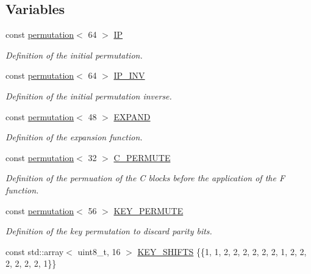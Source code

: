 \subsection*{Variables}
\begin{DoxyCompactItemize}
\item 
const \hyperlink{namespacedes64_1_1__internal_a5b829bc1e22d70ed35b925f8971a88d3}{permutation}$<$ 64 $>$ \hyperlink{namespacedes64_1_1__internal_af57a8d35e765dd0043cc1b7c3d558d38}{IP}
\begin{DoxyCompactList}\small\item\em Definition of the initial permutation. \end{DoxyCompactList}\item 
const \hyperlink{namespacedes64_1_1__internal_a5b829bc1e22d70ed35b925f8971a88d3}{permutation}$<$ 64 $>$ \hyperlink{namespacedes64_1_1__internal_ad0ec70e35aa867cd093ca09bedda1a9c}{I\+P\+\_\+\+I\+NV}
\begin{DoxyCompactList}\small\item\em Definition of the initial permutation inverse. \end{DoxyCompactList}\item 
const \hyperlink{namespacedes64_1_1__internal_a5b829bc1e22d70ed35b925f8971a88d3}{permutation}$<$ 48 $>$ \hyperlink{namespacedes64_1_1__internal_a2ec8d9bfb2f3552b79bbe58d90945b4b}{E\+X\+P\+A\+ND}
\begin{DoxyCompactList}\small\item\em Definition of the expansion function. \end{DoxyCompactList}\item 
const \hyperlink{namespacedes64_1_1__internal_a5b829bc1e22d70ed35b925f8971a88d3}{permutation}$<$ 32 $>$ \hyperlink{namespacedes64_1_1__internal_a214044ceae60c45290f12437f8f8668f}{C\+\_\+\+P\+E\+R\+M\+U\+TE}
\begin{DoxyCompactList}\small\item\em Definition of the permuation of the C blocks before the application of the F function. \end{DoxyCompactList}\item 
const \hyperlink{namespacedes64_1_1__internal_a5b829bc1e22d70ed35b925f8971a88d3}{permutation}$<$ 56 $>$ \hyperlink{namespacedes64_1_1__internal_a9bfe541be2b8bbf16d7e323e6bc55432}{K\+E\+Y\+\_\+\+P\+E\+R\+M\+U\+TE}
\begin{DoxyCompactList}\small\item\em Definition of the key permutation to discard parity bits. \end{DoxyCompactList}\item 
const std\+::array$<$ uint8\+\_\+t, 16 $>$ \hyperlink{namespacedes64_1_1__internal_a2c81a2bef0cd238beb43c412ed37bebb}{K\+E\+Y\+\_\+\+S\+H\+I\+F\+TS} \{\{1, 1, 2, 2, 2, 2, 2, 2, 1, 2, 2, 2, 2, 2, 2, 1\}\}\hypertarget{namespacedes64_1_1__internal_a2c81a2bef0cd238beb43c412ed37bebb}{}\label{namespacedes64_1_1__internal_a2c81a2bef0cd238beb43c412ed37bebb}


\end{DoxyCompactItemize}
